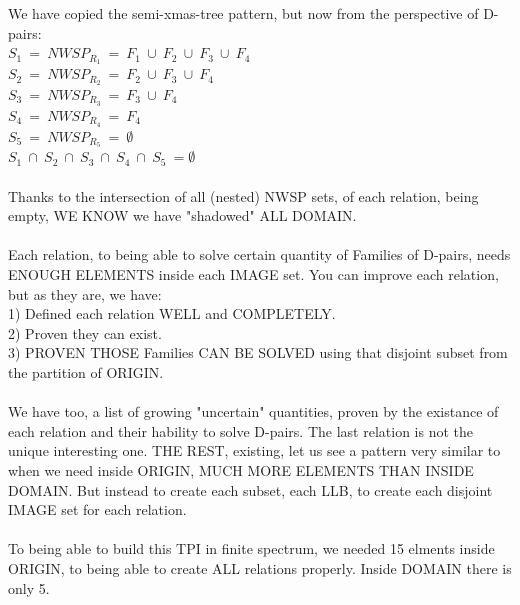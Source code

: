 		\noindent
		We have copied the semi-xmas-tree pattern, but now from the perspective of D-pairs:\\
		$S_{1} \: = \: NWSP_{R_{1}} \: = \: F_{1} \: \cup \: F_{2} \: \cup \: F_{3} \: \cup \: F_{4} $ \\
		$S_{2} \: = \: NWSP_{R_{2}} \: = \: F_{2} \: \cup \: F_{3} \: \cup \: F_{4} $                  \\
		$S_{3} \: = \: NWSP_{R_{3}} \: = \: F_{3} \: \cup \: F_{4} $                                   \\
		$S_{4} \: = \: NWSP_{R_{4}} \: = \: F_{4} $                                                    \\
		$S_{5} \: = \: NWSP_{R_{5}} \: = \: \emptyset $                                                \\
		$S_{1} \: \cap \: S_{2} \: \cap \: S_{3} \: \cap \: S_{4} \: \cap \: S_{5} \: = \emptyset $
		\\\\
		
		\noindent
		Thanks to the intersection of all (nested) NWSP sets, of each relation, being empty, WE KNOW we have "shadowed" ALL DOMAIN.
		\\\\
		
		\noindent
		Each relation, to being able to solve certain quantity of Families of D-pairs, needs ENOUGH ELEMENTS inside each IMAGE set. You can improve each relation, but as they are, we have:\\
		1) Defined each relation WELL and COMPLETELY.\\
		2) Proven they can exist.\\
		3) PROVEN THOSE Families CAN BE SOLVED using that disjoint subset from the partition of ORIGIN.
		\\\\
		
		\noindent
		We have too, a list of growing "uncertain" quantities, proven by the existance of each relation and their hability to solve D-pairs. The last relation is not the unique interesting one. THE REST, existing, let us see a pattern very similar to when we need inside ORIGIN, MUCH MORE ELEMENTS THAN INSIDE DOMAIN. But instead to create each subset, each LLB, to create each disjoint IMAGE set for each relation.
		\\\\
		
		\noindent
		To being able to build this TPI in finite spectrum, we needed 15 elments inside ORIGIN, to being able to create ALL relations properly. Inside DOMAIN there is only 5.
		\\\\
		
